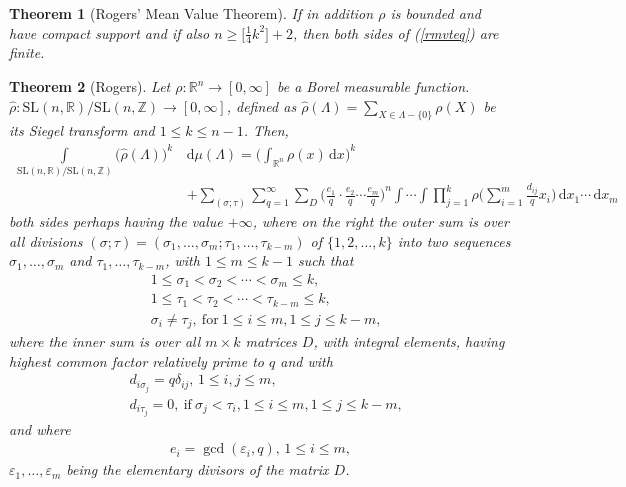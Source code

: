 \documentclass[11pt]{article}
\newtheorem{theorem}{Theorem}[section]
\theoremstyle{definition}
\theoremstyle{proof}
\begin{document}
\begin{theorem}[Rogers' Mean Value Theorem]
    If in addition $\rho$ is bounded and have compact support and if also $n \geq  \big[\frac{1}{4} k ^2\big] + 2$, then both sides of (\ref{rmvteq}) are finite.
\end{theorem}

\begin{theorem}[Rogers]\label{mst}
    Let $ \rho : \mathbb{R}^{n} \to [0, \infty]$ be a Borel measurable function.
    $\widehat{\rho } : \mathrm{SL}(n,\mathbb{R})/\mathrm{SL}(n,\mathbb{Z}) \to [0, \infty]$, defined as $\widehat{\rho } (\Lambda ) = \displaystyle\sum_{X \in \Lambda - \{0\}} \rho (X)$ be its Siegel transform and $1 \leq  k \leq n-1$.
    Then,
    \begin{equation}\label{msteq}
        \begin{split}
            \int\limits_{\mathrm{SL}(n,\mathbb{R})/\mathrm{SL}(n,\mathbb{Z})} {\big(\widehat{\rho }(\Lambda )\big)}^k \,&  \mathrm{d} \mu (\Lambda ) = \bigg(\int_{\mathbb{R}^{n}} \rho (x) \,  \mathrm{d} x\bigg)^k \\
            & + \sum_{(\sigma ; \tau )} \sum_{q=1}^{\infty}\sum_{D} {\bigg(\frac{e_1}{q} \cdot \frac{e_2}{q} \cdots \frac{e_m}{q} \bigg)}^n \int \cdots \int \prod_{j=1}^{k}\rho \bigg(\sum_{i=1}^{m}\frac{d_{ij}}{q} x_i\bigg) \, \mathrm{d} x_1 \cdots \, \mathrm{d} x_m
        \end{split}
    \end{equation}
    both sides perhaps having the value $+\infty$, where on the right the outer sum is over all divisions $(\sigma ; \tau ) = (\sigma _1, \ldots, \sigma _m; \tau _1, \ldots, \tau _{k-m})$ of $\{1, 2, \ldots , k\}$ into two sequences $\sigma _1, \ldots , \sigma _m$ and $\tau _1, \ldots , \tau _{k-m}$, with $1\leq m \leq k-1$ such that
    \begin{align*}
        & 1 \leq \sigma _1 < \sigma _2 < \cdots < \sigma _m \leq  k, \\
        & 1 \leq  \tau _1 < \tau _2 < \cdots < \tau _{k-m} \leq  k, \\
        & \sigma _i \neq \tau _j, \ \text{for} \ 1 \leq  i \leq  m, 1\leq  j\leq  k-m,
    \end{align*}
    where the inner sum is over all $m \times k$ matrices $D$, with integral elements, having highest common factor relatively prime to $q$ and with
    \begin{equation}\label{mstD}
        \begin{split}
            & d_{i \sigma _j} = q \delta _{ij}, \, 1 \leq  i, j \leq  m,\\
            & d_{i \tau _j} = 0, \ \text{if} \ \sigma _j < \tau _i, 1 \leq  i \leq m , 1\leq  j \leq  k-m,
        \end{split}
    \end{equation}
    and where
    \begin{align*}
        e_i = \gcd (\varepsilon _i, q), \, 1 \leq  i \leq  m,
    \end{align*}
    $\varepsilon _1, \ldots , \varepsilon _m$ being the elementary divisors of the matrix $D$.


\end{theorem}
\end{document}
